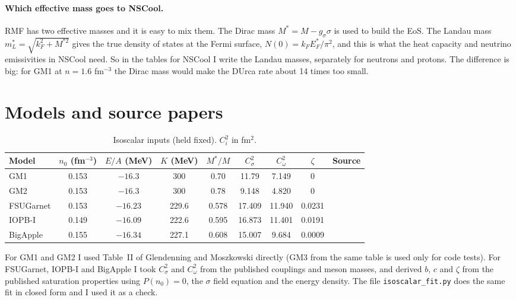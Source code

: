 \documentclass[11pt,a4paper]{article}
\begin{document}
\paragraph{Which effective mass goes to NSCool.} RMF has two effective masses and it is easy to mix them. The Dirac mass $M^*=M-g_\sigma\sigma$ is used to build the EoS. The Landau mass $m_L^*=\sqrt{k_F^2+M^{*2}}$ gives the true density of states at the Fermi surface, $N(0)=k_FE_F^*/\pi^2$, and this is what the heat capacity and neutrino emissivities in NSCool need. So in the tables for NSCool I write the Landau masses, separately for neutrons and protons. The difference is big: for GM1 at $n=1.6$ fm$^{-3}$ the Dirac mass would make the DUrca rate about 14 times too small.

\section{Models and source papers}\label{sec:models}
\begin{table}[h]
\centering
\small
\caption{Isoscalar inputs (held fixed). $C_i^2$ in fm$^2$.}\label{tab:models}
\begin{adjustbox}{max width=\linewidth}
\begin{tabular}{lcccccccl}
\toprule
Model & $n_0$ (fm$^{-3}$) & $E/A$ (MeV) & $K$ (MeV) & $M^*/M$ & $C_\sigma^2$ & $C_\omega^2$ & $\zeta$ & Source\\
\midrule
GM1 & 0.153 & $-16.3$ & 300 & 0.70 & 11.79 & 7.149 & 0 & \cite{GM1991}\\
GM2 & 0.153 & $-16.3$ & 300 & 0.78 & 9.148 & 4.820 & 0 & \cite{GM1991}\\
FSUGarnet & 0.153 & $-16.23$ & 229.6 & 0.578 & 17.409 & 11.940 & 0.0231 & \cite{FSUGarnet}\\
IOPB-I & 0.149 & $-16.09$ & 222.6 & 0.595 & 16.873 & 11.401 & 0.0191 & \cite{IOPBI}\\
BigApple & 0.155 & $-16.34$ & 227.1 & 0.608 & 15.007 & 9.684 & 0.0009 & \cite{BigApple}\\
\bottomrule
\end{tabular}
\end{adjustbox}
\end{table}

\noindent For GM1 and GM2 I used Table~II of Glendenning and Moszkowski directly (GM3 from the same table is used only for code tests). For FSUGarnet, IOPB-I and BigApple I took $C_\sigma^2$ and $C_\omega^2$ from the published couplings and meson masses, and derived $b$, $c$ and $\zeta$ from the published saturation properties using $P(n_0)=0$, the $\sigma$ field equation and the energy density. The file \texttt{isoscalar\_fit.py} does the same fit in closed form and I used it as a check.
\end{document}
